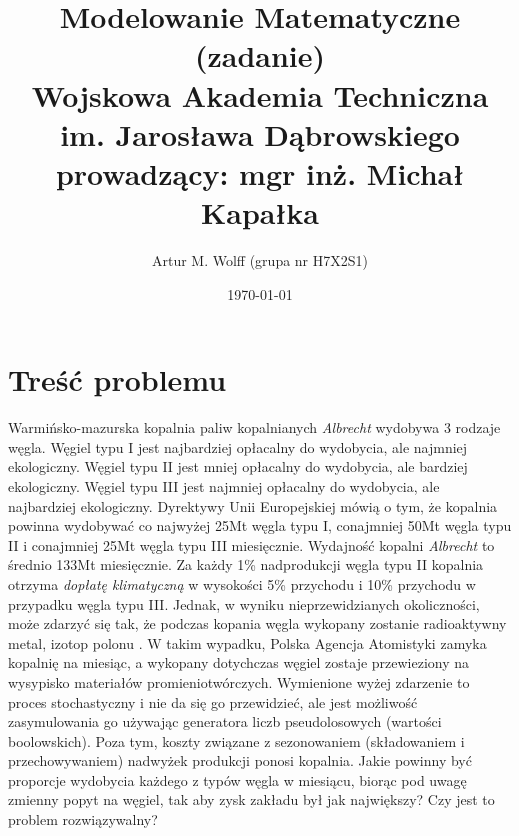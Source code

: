 \documentclass[titlepage]{article}
\title{
	\Large{Modelowanie Matematyczne (zadanie)}
	\\
	\normalsize{Wojskowa Akademia Techniczna im. Jarosława Dąbrowskiego}
	\\
	\normalsize{prowadzący: mgr inż. Michał Kapałka}
	}
\author{Artur M. Wolff (grupa nr H7X2S1)}
\date{\today}
\begin{document}
\maketitle

\section{Treść problemu}
Warmińsko-mazurska kopalnia paliw kopalnianych \textit{Albrecht} wydobywa 3 rodzaje węgla.
Węgiel typu I jest najbardziej opłacalny do wydobycia, ale najmniej ekologiczny.
Węgiel typu II jest mniej opłacalny do wydobycia, ale bardziej ekologiczny.
Węgiel typu III jest najmniej opłacalny do wydobycia, ale najbardziej ekologiczny.
Dyrektywy Unii Europejskiej mówią o tym, że kopalnia powinna wydobywać co najwyżej 25Mt węgla typu I, conajmniej 50Mt węgla typu II i conajmniej 25Mt węgla typu III miesięcznie.
Wydajność kopalni \textit{Albrecht} to średnio 133Mt miesięcznie.
Za każdy 1\% nadprodukcji węgla typu II kopalnia otrzyma \textit{dopłatę klimatyczną} w wysokości 5\% przychodu i 10\% przychodu w przypadku węgla typu III.
Jednak, w wyniku nieprzewidzianych okoliczności, może zdarzyć się tak, że podczas kopania węgla wykopany zostanie radioaktywny metal, izotop polonu .
W takim wypadku, Polska Agencja Atomistyki zamyka kopalnię na miesiąc, a wykopany dotychczas węgiel zostaje przewieziony na wysypisko materiałów promieniotwórczych.
Wymienione wyżej zdarzenie to proces stochastyczny i nie da się go przewidzieć, ale jest możliwość zasymulowania go używając generatora liczb pseudolosowych (wartości boolowskich).
Poza tym, koszty związane z sezonowaniem (składowaniem i przechowywaniem) nadwyżek produkcji ponosi kopalnia.
Jakie powinny być proporcje wydobycia każdego z typów węgla w miesiącu, biorąc pod uwagę zmienny popyt na węgiel, tak aby zysk zakładu był jak największy?
Czy jest to problem rozwiązywalny?
\end{document}
